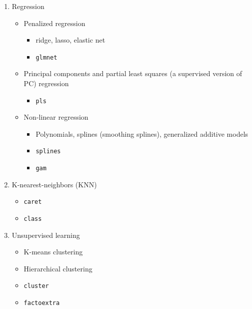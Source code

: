 \documentclass[
]{book}
\providecommand{\tightlist}{%
  \setlength{\itemsep}{0pt}\setlength{\parskip}{0pt}}
\begin{document}
\begin{enumerate}
\def\labelenumi{\arabic{enumi}.}
\tightlist
\item
  Regression

  \begin{itemize}
  \tightlist
  \item
    Penalized regression

    \begin{itemize}
    \tightlist
    \item
      ridge, lasso, elastic net
    \item
      \texttt{glmnet}
    \end{itemize}
  \item
    Principal components and partial least squares (a supervised version of PC) regression

    \begin{itemize}
    \tightlist
    \item
      \texttt{pls}
    \end{itemize}
  \item
    Non-linear regression

    \begin{itemize}
    \tightlist
    \item
      Polynomials, splines (smoothing splines), generalized additive models
    \item
      \texttt{splines}
    \item
      \texttt{gam}
    \end{itemize}
  \end{itemize}
\item
  K-nearest-neighbors (KNN)

  \begin{itemize}
  \tightlist
  \item
    \texttt{caret}
  \item
    \texttt{class}
  \end{itemize}
\item
  Unsupervised learning

  \begin{itemize}
  \tightlist
  \item
    K-means clustering
  \item
    Hierarchical clustering
  \item
    \texttt{cluster}
  \item
    \texttt{factoextra}
  \end{itemize}
\end{enumerate}

  
\end{document}
